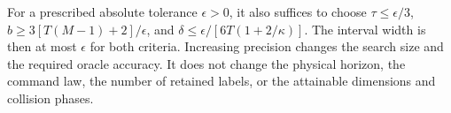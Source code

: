 For a prescribed absolute tolerance $\epsilon>0$, it also suffices to
choose $\tau\le\epsilon/3$,
$b\ge3[T(M-1)+2]/\epsilon$, and
$\delta\le\epsilon/[6T(1+2/\kappa)]$. The interval width is then
at most $\epsilon$ for both criteria. Increasing precision changes
the search size and the required oracle accuracy. It does not change
the physical horizon, the command law, the number of retained labels,
or the attainable dimensions and collision phases.
